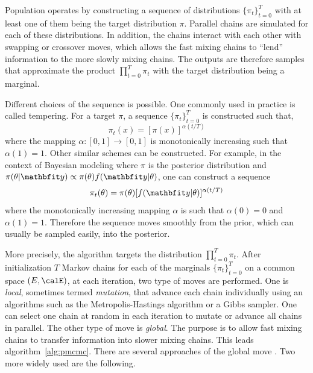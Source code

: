Population \mcmc operates by constructing a sequence of distributions
$\{\pi_t\}_{t=0}^T$ with at least one of them being the target distribution
$\pi$. Parallel \mcmc chains are simulated for each of these distributions. In
addition, the chains interact with each other with swapping or crossover
moves, which allows the fast mixing chains to ``lend'' information to the more
slowly mixing chains. The outputs are therefore samples that approximate the
product $\prod_{t=0}^T\pi_t$ with the target distribution being a marginal.

Different choices of the sequence is possible. One commonly used in practice
is called tempering. For a target $\pi$, a sequence $\{\pi_t\}_{t=0}^T$ is
constructed such that,
\begin{equation}
  \pi_t(x) = [\pi(x)]^{\alpha(t/T)}
\end{equation}
where the mapping $\alpha:[0,1]\to[0,1]$ is monotonically increasing such that
$\alpha(1) = 1$. Other similar schemes can be constructed. For example, in the
context of Bayesian modeling where $\pi$ is the posterior distribution and
$\pi(\theta|\data) \propto \pi(\theta)f(\data|\theta)$, one can construct a
sequence
\begin{equation}
  \pi_t(\theta) = \pi(\theta)[f(\data|\theta)]^{\alpha(t/T)}
  \label{eq:power post}
\end{equation}
where the monotonically increasing mapping $\alpha$ is such that $\alpha(0) =
0$ and $\alpha(1) = 1$. Therefore the sequence moves smoothly from the prior,
which can usually be sampled easily, into the posterior.

More precisely, the algorithm targets the distribution $\prod_{t=0}^T\pi_t$.
After initialization $T$ Markov chains for each of the marginals
$\{\pi_t\}_{t=0}^T$ on a common space $(E,\calE)$, at each iteration, two type
of moves are performed. One is \emph{local}, sometimes termed \emph{mutation},
that advance each chain individually using an \mcmc algorithms such as the
Metropolis-Hastings algorithm or a Gibbs sampler. One can select one chain
at random in each iteration to mutate or advance all chains in parallel. The
other type of move is \emph{global}. The purpose is to allow fast mixing
chains to transfer information into slower mixing chains. This leads
algorithm~\ref{alg:pmcmc}. There are several approaches of the global move
\cite{Jasra:2007in}. Two more widely used are the following.

